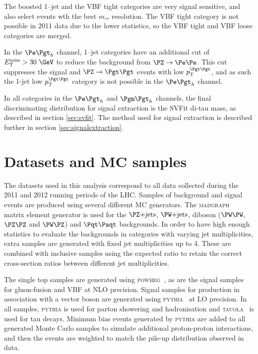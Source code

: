 The boosted 1--jet and the VBF tight categories are very 
signal sensitive, and also select events wth the best $m_{\tau\tau}$ resolution.
The VBF tight category is not possible in 2011 data due to the lower statistics,
so the VBF tight and VBF loose categories are merged. 

In the $\etau$ channel, 1--jet categories have an additional cut of $\MET >
30~\GeV$ to reduce the background from $\PZ\to\Pe\Pe$. This cut suppresses the
signal and $\ZToTauTau$ events with low $\pt^{\Pgt\Pgt}$, and as such the 1-jet low
$\pt^{\Pgt\Pgt}$ category is not possible in the $\etau$ channel. 

In all categories in the $\etau$ and $\mutau$ channels, the final discriminating
distribution for signal extraction is the SVFit di-tau mass, as described in
section \ref{sec:svfit}. The method used for signal extraction is described
further in section \ref{sec:signalextraction}.

\section{Datasets and \ac{MC} samples}
\label{sec:dataandMC}

The datasets used in this analysis correspond to all data collected during the 2011 and
2012 running periods of the \ac{LHC}. Samples of background and signal events are produced using several different
\ac{MC} generators. The \textsc{madgraph}~\cite{Alwall:2011uj} matrix element
generator is used for the $\ZJets$, $\WJets$, diboson ($\PW\PW$, $\PZ\PZ$ and
$\PW\PZ$) and $\ttbar$ backgrounds. 
In order to have high enough statistics to evaluate the
backgrounds in categories with varying jet multiplicities, extra samples are
generated with fixed jet multiplicities up to 4. These are combined with
inclusive samples using the expected ratio to retain the correct cross-section
ratios between different jet multiplicities. 

The single top samples are generated using
\textsc{powheg}~\cite{Frixione:2007vw,Alioli:2010xd,Alioli:2010xa}, as are the
signal samples for gluon-fusion and \ac{VBF} at \ac{NLO} precision. Signal
samples for production in association with a vector boson are generated using
\textsc{pythia}~\cite{Sjostrand:2006za} at \ac{LO} precision. In all
samples, \textsc{pythia} is used for parton showering and hadronisation and
\textsc{tauola}~\cite{TAUOLA} is used for tau decays. Minimum bias events
generated by \textsc{pythia} are added to all generated Monte Carlo samples
to simulate additional proton-proton interactions, and then the events are
weighted to match the pile-up distribution observed in data. 

